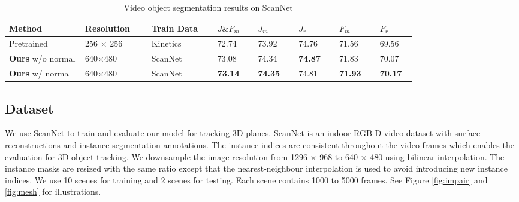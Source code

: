 \begin{table*}[t]
\centering
\begin{tabular}{p{0.15\linewidth}p{0.13\linewidth}p{0.13\linewidth}p{0.08\linewidth}p{0.08\linewidth}p{0.08\linewidth}p{0.08\linewidth}p{0.06\linewidth}}
\hline
Method & Resolution & Train Data & $J\&F_m$ & $J_m$ & $J_r$ & $F_m$ & $F_r$\\
\hline
Pretrained \cite{jabri2020walk} & 256 $\times$ 256 &  Kinetics & 72.74 & 73.92 & 74.76 & 71.56 & 69.56\\
\textbf{Ours} w/o normal & 640$\times$480 & ScanNet & 73.08 & 74.34 & \textbf{74.87} & 71.83 & 70.07 \\
\textbf{Ours} w/ normal & 640$\times$480 & ScanNet & \textbf{73.14} & \textbf{74.35} & 74.81 & \textbf{71.93} & \textbf{70.17} \\
\hline
\end{tabular}
 \vspace{-0.1in}
\caption{Video object segmentation results on ScanNet}
 \vspace{-0.15in}
\label{table:quan}
\end{table*}




\subsection{Dataset}

We use ScanNet \cite{dai2017scannet} to train and evaluate our model for tracking 3D planes. ScanNet \cite{dai2017scannet} is an indoor RGB-D video dataset with surface reconstructions and instance segmentation annotations. The instance indices are consistent throughout the video frames which enables the evaluation for 3D object tracking. We downsample the image resolution from 1296 $\times$ 968 to 640 $\times$ 480 using bilinear interpolation. The instance masks are resized with the same ratio except that the nearest-neighbour interpolation is used to avoid introducing new instance indices. We use 10 scenes for training and 2 scenes for testing. Each scene contains 1000 to 5000 frames. See Figure \ref{fig:impair} and \ref{fig:mesh} for illustrations.


